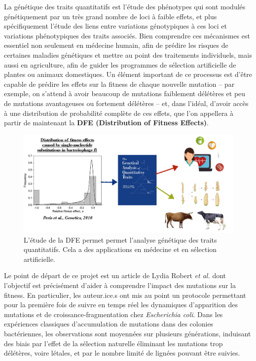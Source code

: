 \documentclass[12pt]{article}
\begin{document}
La génétique des traits quantitatifs \cite{mac} est l'étude des phénotypes qui sont modulés génétiquement par un très grand nombre de loci à faible effets, et plus spécifiquement l'étude des liens entre variations génotypiques à ces loci et variations phénotypiques des traits associés. Bien comprendre ces mécanismes est essentiel non seulement en médecine humain, afin de prédire les risques de certaines maladies génétiques et mettre au point des traitements individuels, mais aussi en agriculture, afin de guider les programmes de sélection artificielle de plantes ou animaux domestiques. Un élément important de ce processus est d'être capable de prédire les effets sur la fitness de chaque nouvelle mutation -- par exemple, on s'attend à avoir beaucoup de mutations faiblement délétères et peu de mutations avantageuses ou fortement délétères -- et, dans l'idéal, d'avoir accès à une distribution de probabilité complète de ces effets, que l'on appellera à partir de maintenant la \textbf{DFE (Distribution of Fitness Effects)}.

\begin{figure}[h]
 \begin{center}
	\vspace{3mm}
	\includegraphics[scale=0.25]{../Img/DFE_phage_2010.jpg}
\end{center} 
  \caption{L'étude de la DFE permet permet l'analyse génétique des traits quantitatifs. Cela a des applications en médecine et en sélection artificielle.}
\end{figure}

Le point de départ de ce projet est un article de Lydia Robert \textit{et al.} \cite{rob} dont l'objectif est précisément d'aider à comprendre l’impact des mutations sur la fitness. En particulier, les auteur.ice.s ont mis au point un protocole permettant pour la première fois de suivre en temps réel les dynamiques d’apparition des mutations et de croissance-fragmentation chez \textit{Escherichia coli}. Dans les expériences classiques d’accumulation de mutations dans des colonies bactériennes, les observations sont moyennées sur plusieurs générations, induisant des biais par l’effet de la sélection naturelle éliminant les mutations trop délétères, voire létales, et par le nombre limité de lignées pouvant être suivies. 
\end{document}
